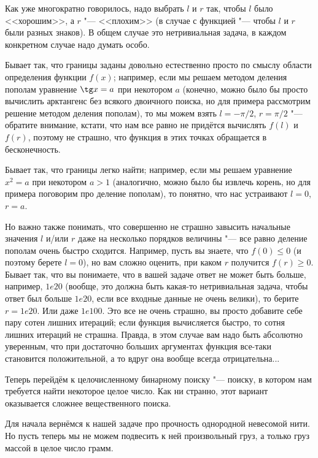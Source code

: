  Как уже многократно говорилось, надо выбрать $l$ и $r$ так, чтобы $l$ было <<хорошим>>, а $r$ "--- <<плохим>>
(в случае с функцией "--- чтобы $l$ и $r$ были разных знаков). 
В общем случае это нетривиальная задача, в каждом конкретном случае надо думать особо.

Бывает так, что границы заданы довольно естественно просто по смыслу области определения функции $f(x)$;
например, если мы решаем методом деления пополам уравнение $\tg x=a$ при некотором $a$ 
(конечно, можно было бы просто вычислить арктангенс без всякого двоичного поиска, но для примера рассмотрим решение методом деления пополам), 
то мы можем взять $l=-\pi/2$, $r=\pi/2$ "--- обратите внимание, кстати, что нам все равно не придётся вычислять $f(l)$ и $f(r)$, поэтому не страшно,
что функция в этих точках обращается в бесконечность.

Бывает так, что границы легко найти; например, если мы решаем уравнение $x^2=a$ при некотором $a>1$
(аналогично, можно было бы извлечь корень, но для примера поговорим про деление пополам), то понятно,
что нас устраивают $l=0$, $r=a$.

Но важно также понимать, что совершенно не страшно завысить начальные значения $l$ и/или $r$ даже на несколько порядков величины
"--- все равно деление пополам очень быстро сходится.
Например, пусть вы знаете, что $f(0)\leq 0$ (и поэтому берете $l=0$), но вам сложно оценить, при каком $r$ получится $f(r)\geq 0$.
Бывает так, что вы понимаете, что в вашей задаче ответ не может быть больше, например, $1e20$ (вообще, это должна быть
какая-то нетривиальная задача, чтобы ответ был больше $1e20$, если все входные данные не очень велики), то берите $r=1e20$.
Или даже $1e100$. 
Это все не очень страшно, вы просто добавите себе пару сотен лишних итераций; если функция вычисляется быстро, то сотня лишних итераций не страшна.
Правда, в этом случае вам надо быть абсолютно уверенным, что при достаточно больших аргументах функция все-таки становится положительной,
а то вдруг она вообще всегда отрицательна...

Теперь перейдём к целочисленному бинарному поиску "--- поиску, в котором нам требуется найти некоторое целое число. 
Как ни странно, этот вариант оказывается сложнее вещественного поиска.

 Для начала вернёмся к нашей задаче про прочность однородной невесомой нити. 
Но пусть теперь мы не можем подвесить к ней произвольный груз, а только груз массой в целое число грамм.

